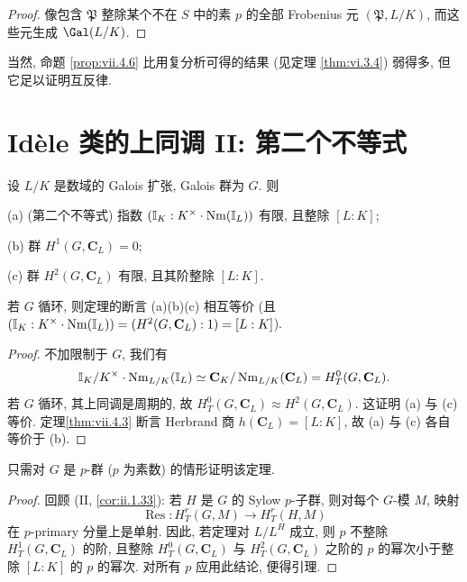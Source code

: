 \begin{proof}
像包含 $\mathfrak{P}$ 整除某个不在 $S$ 中的素 $p$ 的全部 Frobenius 元 $(\mathfrak{P},L/K)$, 而这些元生成 $\Gal(L/K)$.
\end{proof}

\begin{remark}\label{rem:vii.4.9}
当然, 命题 \ref{prop:vii.4.6} 比用复分析可得的结果 (见定理 \ref{thm:vi.3.4}) 弱得多, 但它足以证明互反律.
\end{remark}

\section{Idèle 类的上同调 II: 第二个不等式}\label{sec:VII.5}

\begin{theorem}\label{thm:vii.5.1}
设 $L/K$ 是数域的 Galois 扩张, Galois 群为 $G$. 则

(a) (第二个不等式) 指数 $(\mathbb{I}_K:K^{\times}\cdot\operatorname{Nm}(\mathbb{I}_L))$ 有限, 且整除 $[L:K]$;

(b) 群 $H^{1}(G,\mathbf{C}_{L})=0$;

(c) 群 $H^{2}(G,\mathbf{C}_{L})$ 有限, 且其阶整除 $[L:K]$.
\end{theorem}

\begin{lemma}\label{lem:vii.5.2}
若 $G$ 循环, 则定理的断言 (a)(b)(c) 相互等价 (且 $(\mathbb{I}_K:K^{\times}\cdot\operatorname{Nm}(\mathbb{I}_L))=(H^{2}(G,\mathbf{C}_L):1)=[L:K]$).
\end{lemma}

\begin{proof}
不加限制于 $G$, 我们有
\[
\mathbb{I}_{K}/K^{\times}\cdot\operatorname{Nm}_{L/K}(\mathbb{I}_{L})\simeq\mathbf{C}_{K}/\operatorname{Nm}_{L/K}(\mathbf{C}_{L})=H_{T}^{0}(G,\mathbf{C}_{L}).
\]
若 $G$ 循环, 其上同调是周期的, 故 $H_T^{0}(G,\mathbf{C}_L)\approx H^{2}(G,\mathbf{C}_L)$. 这证明 (a) 与 (c) 等价. 定理\ref{thm:vii.4.3} 断言 Herbrand 商 $h(\mathbf{C}_L)=[L:K]$, 故 (a) 与 (c) 各自等价于 (b).
\end{proof}

\begin{lemma}\label{lem:vii.5.3}
只需对 $G$ 是 $p$-群 ($p$ 为素数) 的情形证明该定理.
\end{lemma}

\begin{proof}
回顾 (II, \ref{cor:ii.1.33}): 若 $H$ 是 $G$ 的 Sylow $p$-子群, 则对每个 $G$-模 $M$, 映射
\[
\operatorname{Res}\colon H_{T}^{r}(G,M)\to H_{T}^{r}(H,M)
\]
在 $p$-primary 分量上是单射. 因此, 若定理对 $L/L^{H}$ 成立, 则 $p$ 不整除 $H_T^{1}(G,\mathbf{C}_L)$ 的阶, 且整除 $H_T^{0}(G,\mathbf{C}_L)$ 与 $H_T^{2}(G,\mathbf{C}_L)$ 之阶的 $p$ 的幂次小于整除 $[L:K]$ 的 $p$ 的幂次. 对所有 $p$ 应用此结论, 便得引理.
\end{proof}

